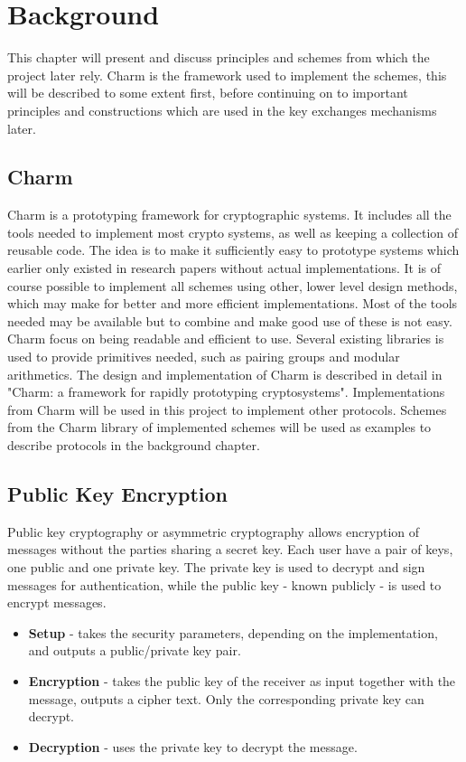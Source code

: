 \chapter{Background}
\label{chp:background} 
This chapter will present and discuss principles and schemes from which the project later rely. Charm is the framework used to implement the schemes, this will be described to some extent first, before continuing on to important principles and constructions which are used in the key exchanges mechanisms later.

\section{Charm}
Charm\cite{DBLP:Charm13} is a prototyping framework for cryptographic systems. It includes all the tools needed to implement most crypto systems, as well as keeping a collection of reusable code. The idea is to make it sufficiently easy to prototype systems which earlier only existed in research papers without actual implementations. It is of course possible to implement all schemes using other, lower level design methods, which may make for better and more efficient implementations. Most of the tools needed may be available but to combine and make good use of these is not easy. Charm focus on being readable and efficient to use. Several existing libraries is used to provide primitives needed, such as pairing groups and modular arithmetics. The design and implementation of Charm is described in detail in "Charm: a framework for rapidly prototyping cryptosystems"\cite{DBLP:Charm13}. Implementations from Charm will be used in this project to implement other protocols. Schemes from the Charm library of implemented schemes will be used as examples to describe protocols in the background chapter.

\section{Public Key Encryption}\label{sec:pke}
Public key cryptography or asymmetric cryptography allows encryption of messages without the parties sharing a secret key. Each user have a pair of keys, one public and one private key. The private key is used to decrypt and sign messages for authentication, while the public key - known publicly - is used to encrypt messages. 
\begin{itemize}
\item \textbf{Setup} - takes the security parameters, depending on the implementation, and outputs a public/private key pair.
\item \textbf{ Encryption } - takes the public key of the receiver as input together with the message, outputs a cipher text. Only the corresponding private key can decrypt.
\item \textbf{ Decryption } - uses the private key to decrypt the message.
\end{itemize}

